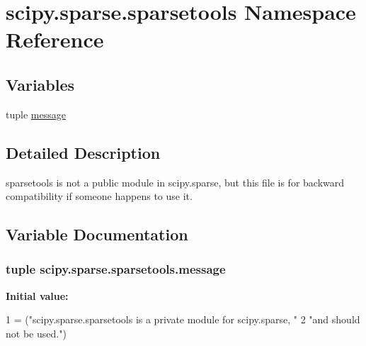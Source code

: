 \hypertarget{namespacescipy_1_1sparse_1_1sparsetools}{}\section{scipy.\+sparse.\+sparsetools Namespace Reference}
\label{namespacescipy_1_1sparse_1_1sparsetools}
\subsection*{Variables}
\begin{DoxyCompactItemize}
\item 
tuple \hyperlink{namespacescipy_1_1sparse_1_1sparsetools_ac65434fea90d32c21b38241febb77d41}{message}
\end{DoxyCompactItemize}


\subsection{Detailed Description}
\begin{DoxyVerb}sparsetools is not a public module in scipy.sparse, but this file is
for backward compatibility if someone happens to use it.
\end{DoxyVerb}
 

\subsection{Variable Documentation}
\hypertarget{namespacescipy_1_1sparse_1_1sparsetools_ac65434fea90d32c21b38241febb77d41}{}
\subsubsection[{message}]{\setlength{\rightskip}{0pt plus 5cm}tuple scipy.\+sparse.\+sparsetools.\+message}\label{namespacescipy_1_1sparse_1_1sparsetools_ac65434fea90d32c21b38241febb77d41}
{\bfseries Initial value\+:}
\begin{DoxyCode}
1 = (\textcolor{stringliteral}{"scipy.sparse.sparsetools is a private module for scipy.sparse, "}
2                     \textcolor{stringliteral}{"and should not be used."})
\end{DoxyCode}

